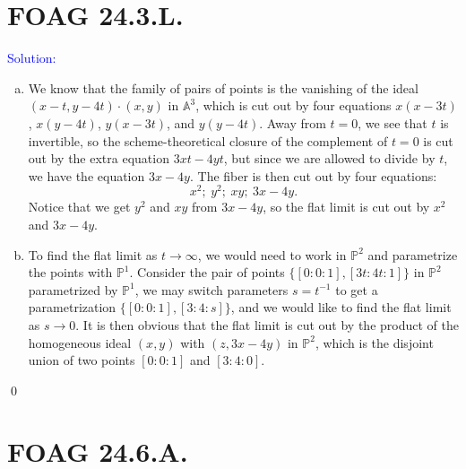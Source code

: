 \documentclass[11pt]{article}
\renewcommand{\AA}{\mathbb{A}}
\newcommand{\PP}{\mathbb{P}}
\newenvironment{solution}{\begin{trivlist}\item[]{\textcolor{blue}{Solution:}}}{\qed \end{trivlist}}
\begin{document}
\newpage

\section*{FOAG 24.3.L.}

\begin{solution}
\begin{enumerate}[(a)]
    \item We know that the family of pairs of points is the vanishing of the ideal $(x - t, y - 4t) \cdot (x, y)$ in $\AA^3$, which is cut out by four equations $x(x - 3t)$, $x (y - 4t)$, $y (x - 3t)$, and $y (y - 4t)$. Away from $t = 0$, we see that $t$ is invertible, so the scheme-theoretical closure of the complement of $t = 0$ is cut out by the extra equation $3xt - 4yt$, but since we are allowed to divide by $t$, we have the equation $3x - 4y$. The fiber is then cut out by four equations:
    \[
        x^2; \hspace{3pt} y^2; \hspace{3pt} xy; \hspace{3pt} 3x - 4y.
    \]
    Notice that we get $y^2$ and $xy $ from $3x - 4y$, so the flat limit is cut out by $x^2$ and $3x - 4y$. 

    \item To find the flat limit as $t \rightarrow \infty$, we would need to work in $\PP^2$ and parametrize the points with $\PP^1$. Consider the pair of points $\{[0:0:1], [3t:4t:1]\}$ in $\PP^2$ parametrized by $\PP^1$, we may switch parameters $s = t^{-1}$ to get a parametrization $\{[0:0:1], [3:4:s]\}$, and we would like to find the flat limit as $s \rightarrow 0$. It is then obvious that the flat limit is cut out by the product of the homogeneous ideal $(x, y)$ with $(z, 3x - 4y)$ in $\PP^2$, which is the disjoint union of two points $[0:0:1]$ and $[3:4:0]$. 
\end{enumerate}
\end{solution}

\newpage

\section*{FOAG 24.6.A.}
\end{document}
